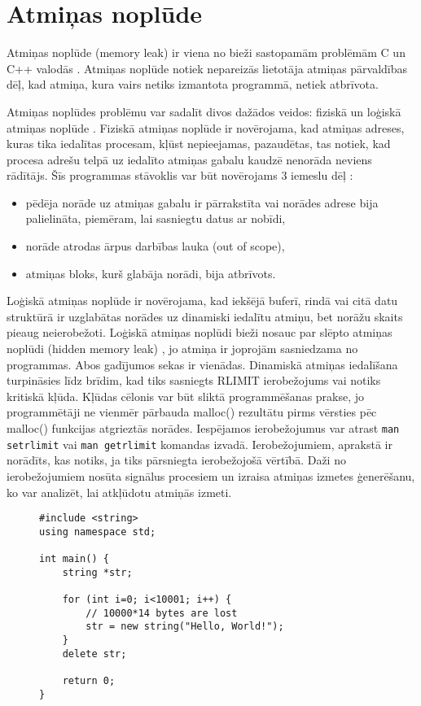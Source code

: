 ﻿\section{Atmiņas noplūde}


Atmiņas noplūde (memory leak) ir viena no bieži sastopamām problēmām C un C++ valodās \cite{atparv}.
Atmiņas noplūde notiek nepareizās lietotāja atmiņas pārvaldības dēļ, kad atmiņa, kura vairs netiks izmantota programmā, netiek atbrīvota.

Atmiņas noplūdes problēmu var sadalīt divos dažādos veidos: fiziskā un loģiskā atmiņas noplūde \cite{JMMR}.
Fiziskā atmiņas noplūde ir novērojama, kad atmiņas adreses, kuras tika iedalītas procesam,  kļūst nepieejamas, pazaudētas, tas notiek, kad procesa adrešu telpā uz iedalīto atmiņas gabalu kaudzē nenorāda neviens rādītājs.
Šīs programmas stāvoklis var būt novērojams 3 iemeslu dēļ \cite{JMMR}:
\begin{itemize}
\item pēdēja norāde uz atmiņas gabalu ir pārrakstīta vai norādes adrese bija palielināta, piemēram, lai sasniegtu datus ar nobīdi,
\item norāde atrodas ārpus darbības lauka (out of scope),
\item atmiņas bloks, kurš glabāja norādi, bija atbrīvots.
\end{itemize}

Loģiskā atmiņas noplūde ir novērojama, kad iekšējā buferī, rindā vai citā datu struktūrā ir uzglabātas norādes uz dinamiski iedalītu atmiņu, bet norāžu skaits pieaug neierobežoti.
Loģiskā atmiņas noplūdi bieži nosauc par slēpto atmiņas noplūdi (hidden memory leak) \cite{RRUU}, jo atmiņa ir joprojām sasniedzama no programmas.
Abos gadījumos sekas ir vienādas. 
Dinamiskā atmiņas iedalīšana turpināsies līdz brīdim, kad  tiks sasniegts RLIMIT ierobežojums vai notiks kritiskā kļūda.
Kļūdas cēlonis var būt sliktā programmēšanas prakse, jo programmētāji ne vienmēr pārbauda malloc() rezultātu pirms vērsties pēc malloc() funkcijas atgrieztās norādes.
Iespējamos ierobežojumus var atrast \texttt{man setrlimit} vai \texttt{man getrlimit} komandas izvadā. 
Ierobežojumiem, aprakstā ir norādīts, kas notiks, ja tiks pārsniegta ierobežojošā vērtībā.
Daži no ierobežojumiem nosūta signālus procesiem un izraisa atmiņas izmetes ģenerēšanu, ko var analizēt, lai atkļūdotu atmiņās izmeti.
\begin{figure}[h]
\begin{lstlisting}
#include <string>
using namespace std;

int main() {
    string *str;

    for (int i=0; i<10001; i++) {
        // 10000*14 bytes are lost
        str = new string("Hello, World!");
    }
    delete str;

    return 0;
}
\end{lstlisting}
\caption{\textbf{\fontsize{11}{12}\selectfont {Atmiņas noplūde, C++}}}
\end{figure}


